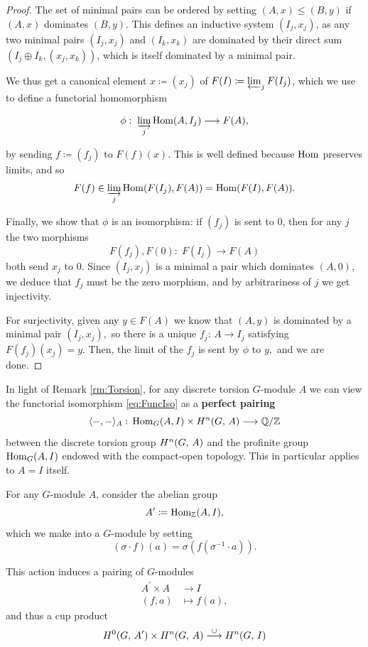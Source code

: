 \documentclass[a4paper, oneside]{memoir}
\begin{document}
\begin{proof}
	The set of minimal pairs can be ordered by setting \((A,x)\leq (B,y)\) if \((A,x)\) dominates \((B,y)\). This defines an inductive system \((I_j,x_j)\), as any two minimal pairs \((I_j,x_j)\) and \((I_k,x_k)\) are dominated by their direct sum \(\left(I_j\oplus I_k,(x_j,x_k)\right)\), which is itself dominated by a minimal pair.

	We thus get a canonical element \(x\coloneqq (x_j)\) of \(F(I)\coloneqq \varprojlim_j F(I_j)\), which we use to define a functorial homomorphism

	\[
		\phi: \; \varinjlim_j \operatorname{Hom}(A,I_j)\longrightarrow F(A),
	\]

	by sending \(f\coloneqq (f_j)\) to \(F(f)(x)\). This is well defined because \(\operatorname{Hom}\) preserves limits, and so
	\[
		F(f)\in\varinjlim_j{\operatorname{Hom}(F(I_j),F(A))}=\operatorname{Hom}(F(I),F(A)).
	\]

	Finally, we show that \(\phi\) is an isomorphism: if \((f_j)\) is sent to \(0\), then for any \(j\) the two morphisms
	\[
		F(f_j), F(0):\; F(I_j) \to F(A)
	\]
	both send \(x_j\) to \(0.\) Since \((I_j,x_j)\) is a minimal a pair which dominates \((A,0)\), we deduce that \(f_j\) must be the zero morphism, and by arbitrariness of \(j\) we get injectivity.

	For surjectivity, given any \(y\in F(A)\) we know that \((A,y)\) is dominated by a minimal pair \((I_j,x_j),\) so there is a unique \(f_j:\, A\to I_j\) satisfying \(F(f_j)(x_j)=y.\) Then, the limit of the \(f_j\) is sent by \(\phi\) to \(y,\) and we are done.
\end{proof}


\begin{remark}
	In light of Remark \ref{rm:Torsion}, for any discrete torsion $G$-module $A$ we can view the functorial isomorphism \eqref{eq:FuncIso} as a \textbf{perfect pairing}
	\[
		\langle-,-\rangle_A:\,\operatorname{Hom}_G(A,I)\times H^{n}( G, \, A )\longrightarrow\mathbb{Q} /\mathbb{Z}
	\]
	between the discrete torsion group \(H^{n}( G, \, A )\) and the profinite group \(\operatorname{Hom}_G(A,I)\) endowed with the compact-open topology. This in particular applies to $A=I$ itself.
\end{remark}

For any \(G\)-module \(A\), consider the abelian group
\[
	A^{\prime}\coloneqq \operatorname{Hom}_{\mathbb{Z}}(A,I),
\]
which we make into a \(G\)-module by setting
\begin{equation}\label{eq:TateTwist}
	(\sigma\cdot f)(a)=\sigma(f(\sigma^{-1}\cdot a)).
\end{equation}

This action induces a pairing of \(G\)-modules
\begin{align*}
	A^\prime\times A & \to I         \\
	(f,a)            & \mapsto f(a),
\end{align*}
and thus a cup product
\[
	H^{0}( G, \, A^\prime )\times H^{n}( G, \, A )\overset{\cup}{\longrightarrow}H^{n}( G, \, I )
\]
\end{document}
